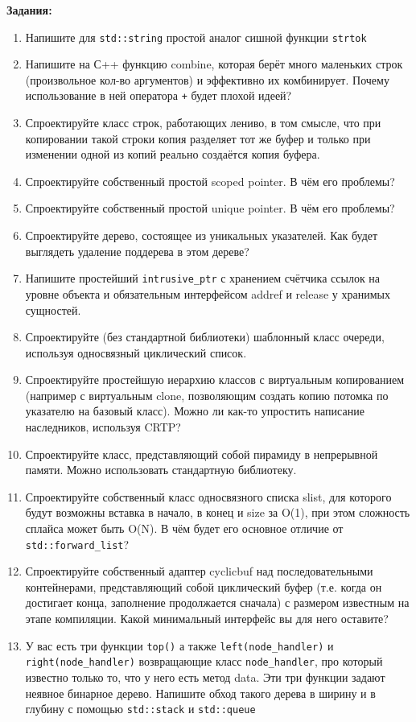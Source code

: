 \documentclass[a4paper,12pt,oneside]{book}
\begin{document}
\textbf{Задания:}

\begin{enumerate}
\item 
Напишите для \lstinline!std::string! простой аналог сишной функции \lstinline!strtok!
\item 
Напишите на С++ функцию combine, которая берёт много маленьких строк (произвольное кол-во аргументов) и эффективно их комбинирует. Почему использование в ней оператора \lstinline!+! будет плохой идеей?
\item 
Спроектируйте класс строк, работающих лениво, в том смысле, что при копировании такой строки копия разделяет тот же буфер и только при изменении одной из копий реально создаётся копия буфера.
\item 
Спроектируйте собственный простой scoped pointer. В чём его проблемы?
\item 
Спроектируйте собственный простой unique pointer. В чём его проблемы?
\item 
Спроектируйте дерево, состоящее из уникальных указателей. Как будет выглядеть удаление поддерева в этом дереве?
\item 
Напишите простейший \lstinline!intrusive_ptr! с хранением счётчика ссылок на уровне объекта и обязательным интерфейсом addref и release у хранимых сущностей.
\item 
Спроектируйте (без стандартной библиотеки) шаблонный класс очереди, используя односвязный циклический список.
\item 
Спроектируйте простейшую иерархию классов с виртуальным копированием (например с виртуальным clone, позволяющим создать копию потомка по указателю на базовый класс). Можно ли как-то упростить написание наследников, используя CRTP?
\item 
Спроектируйте класс, представляющий собой пирамиду в непрерывной памяти. Можно использовать стандартную библиотеку.
\item 
Спроектируйте собственный класс односвязного списка slist, для которого будут возможны вставка в начало, в конец и size за O(1), при этом сложность сплайса может быть O(N). В чём будет его основное отличие от \lstinline!std::forward_list!?
\item 
Спроектируйте собственный адаптер cyclicbuf над последовательными контейнерами, представляющий собой циклический буфер (т.е. когда он достигает конца, заполнение продолжается сначала) с размером известным на этапе компиляции. Какой минимальный интерфейс вы для него оставите?
\item 
У вас есть три функции \lstinline!top()! а также \lstinline!left(node_handler)! и \lstinline!right(node_handler)! возвращающие класс \lstinline!node_handler!, про который известно только то, что у него есть метод data. Эти три функции задают неявное бинарное дерево. Напишите обход такого дерева в ширину и в глубину с помощью \lstinline!std::stack! и \lstinline!std::queue!

\end{enumerate}
\end{document}
